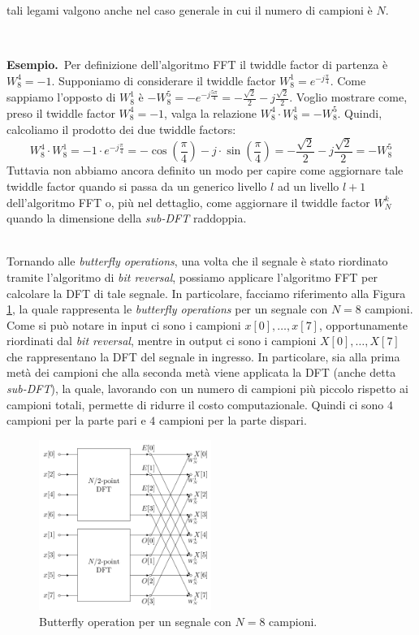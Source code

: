 \documentclass[a4paper,12pt]{report}  %
\newcommand{\namedparagraph}[2]{%
    \noindent\colorbox{cyan!20}{\parbox{\dimexpr\linewidth-2\fboxsep}{\textbf{#1}~#2}}%
}
\begin{document}
tali legami valgono anche nel caso generale in cui il numero di campioni è $N$.

\noindent\\ \namedparagraph{Esempio.}{Per definizione dell'algoritmo FFT il twiddle factor di partenza è $W_8^4 = -1$.
Supponiamo di considerare il twiddle factor $W_8^1 = e^{-j \frac{\pi}{4}}$.
Come sappiamo l'opposto di $W_8^1$ è $-W_8^5 = -e^{-j \frac{5 \pi}{4}} = -\frac{\sqrt{2}}{2} - j \frac{\sqrt{2}}{2}$.
Voglio mostrare come, preso il twiddle factor $W_8^4 = -1$, valga la relazione $W_8^4 \cdot W_8^1 = -W_8^5$.
Quindi, calcoliamo il prodotto dei due twiddle factors:
\begin{equation}
    W_8^4 \cdot W_8^1 = -1 \cdot e^{-j \frac{\pi}{4}} = -\cos \left( \frac{\pi}{4} \right) - j \cdot \sin \left( \frac{\pi}{4} \right) = -\frac{\sqrt{2}}{2} - j \frac{\sqrt{2}}{2} = -W_8^5 \nonumber
\end{equation}
Tuttavia non abbiamo ancora definito un modo per capire come aggiornare tale twiddle factor quando si passa da un generico livello $l$ ad un livello $l + 1$ dell'algoritmo FFT o, più nel dettaglio, come aggiornare il twiddle factor $W_N^k$ quando la dimensione della \textit{sub-DFT} raddoppia.}

\noindent\\ Tornando alle \textit{butterfly operations}, una volta che il segnale è stato riordinato tramite l'algoritmo di \textit{bit reversal}, possiamo applicare l'algoritmo FFT per calcolare la DFT di tale segnale.
In particolare, facciamo riferimento alla Figura \ref{fig:butterfly}, la quale rappresenta le \textit{butterfly operations} per un segnale con $N = 8$ campioni.
Come si può notare in input ci sono i campioni $x[0], \dots, x[7]$, opportunamente riordinati dal \textit{bit reversal}, mentre in output ci sono i campioni $X[0], \dots, X[7]$ che rappresentano la DFT del segnale in ingresso.
In particolare, sia alla prima metà dei campioni che alla seconda metà viene applicata la DFT (anche detta \textit{sub-DFT}), la quale, lavorando con un numero di campioni più piccolo rispetto ai campioni totali, permette di ridurre il costo computazionale.
Quindi ci sono $4$ campioni per la parte pari e $4$ campioni per la parte dispari.

\begin{figure}[h]
    \centering
    \includegraphics[width=0.5\textwidth]{imgs/DIT-FFT-butterfly.png}
    \caption{Butterfly operation per un segnale con $N = 8$ campioni.}
    \label{fig:butterfly}
\end{figure}
\end{document}
